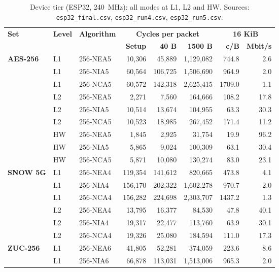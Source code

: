 \begin{table}[!htbp]
\centering
\caption{Device tier (ESP32, 240~MHz): all modes at L1, L2 and HW. Sources: \texttt{esp32\_final.csv}, \texttt{esp32\_run4.csv}, \texttt{esp32\_run5.csv}.}
\label{tab:s-esp32}
\footnotesize
\begin{tabular}{@{}>{\bfseries}l l l r r r r r@{}}
\toprule
\textbf{Set} & \textbf{Level} & \textbf{Algorithm} & \multicolumn{3}{c}{\textbf{Cycles per packet}} & \multicolumn{2}{c}{\textbf{16 KiB}} \\
\cmidrule(lr){4-6}\cmidrule(l){7-8}
& & & \textbf{Setup} & \textbf{40 B} & \textbf{1500 B} & \textbf{c/B} & \textbf{Mbit/s} \\
\midrule
AES-256 & L1 & 256-NEA5 & 10{,}306 & 45{,}889 & 1{,}129{,}082 & 744.8 & 2.6 \\
 & L1 & 256-NIA5 & 60{,}564 & 106{,}725 & 1{,}506{,}690 & 964.9 & 2.0 \\
 & L1 & 256-NCA5 & 60{,}572 & 142{,}318 & 2{,}625{,}415 & 1709.0 & 1.1 \\
 & L2 & 256-NEA5 & 2{,}271 & 7{,}560 & 164{,}666 & 108.2 & 17.8 \\
 & L2 & 256-NIA5 & 10{,}514 & 13{,}674 & 104{,}955 & 63.3 & 30.3 \\
 & L2 & 256-NCA5 & 10{,}523 & 18{,}985 & 267{,}452 & 171.4 & 11.2 \\
 & HW & 256-NEA5 & 1{,}845 & 2{,}925 & 31{,}754 & 19.9 & 96.2 \\
 & HW & 256-NIA5 & 5{,}865 & 9{,}024 & 100{,}309 & 63.1 & 30.4 \\
 & HW & 256-NCA5 & 5{,}871 & 10{,}080 & 130{,}274 & 83.0 & 23.1 \\
\midrule
SNOW 5G & L1 & 256-NEA4 & 119{,}354 & 141{,}612 & 820{,}665 & 473.8 & 4.1 \\
 & L1 & 256-NIA4 & 156{,}170 & 202{,}322 & 1{,}602{,}278 & 970.7 & 2.0 \\
 & L1 & 256-NCA4 & 156{,}282 & 224{,}698 & 2{,}303{,}707 & 1437.2 & 1.3 \\
 & L2 & 256-NEA4 & 13{,}795 & 16{,}377 & 84{,}530 & 47.8 & 40.1 \\
 & L2 & 256-NIA4 & 19{,}317 & 22{,}477 & 113{,}760 & 63.9 & 30.1 \\
 & L2 & 256-NCA4 & 19{,}326 & 25{,}080 & 184{,}594 & 111.0 & 17.3 \\
\midrule
ZUC-256 & L1 & 256-NEA6 & 41{,}805 & 52{,}281 & 374{,}059 & 223.6 & 8.6 \\
 & L1 & 256-NIA6 & 66{,}878 & 113{,}031 & 1{,}513{,}006 & 965.3 & 2.0 \\

\end{tabular}
\end{table}
